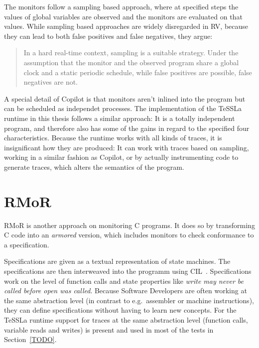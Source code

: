 The monitors follow a sampling based approach, where at specified steps the values of global variables are observed and the monitors are evaluated
on that values.
While sampling based approaches are widely disregarded in RV, because they can lead to both false positives and false negatives,
they argue:

\begin{quote}
  In a hard real-time context, sampling is a suitable strategy. Under
  the assumption that the monitor and the observed program share a global clock and a static periodic schedule, while false positives are possible, false negatives are not.~\cite{Pike2010}
\end{quote}

A special detail of Copilot is that monitors aren't inlined into the program but can be scheduled as independet processes.
The implementation of the TeSSLa runtime in this thesis follows a similar approach: It is a totally independent program,
and therefore also has some of the gains in regard to the specified four characteristics.
Because the runtime works with all kinds of traces, it is insignificant how they are produced:
It can work with traces based on sampling, working in a similar fashion as Copilot, or by actually instrumenting code to generate
traces, which alters the semantics of the program.


\section{RMoR}
\label{sec:related:rmor}

RMoR is another approach on monitoring C programs.
It does so by transforming C code into an \emph{armored} version, which includes monitors to check conformance to a specification.

Specifications are given as a textual representation of state machines.
The specifications are then interweaved into the programm using CIL~\cite{Necula2002}.
Specifications work on the level of function calls and state properties like \emph{write may never be called before open was called}.
Because Software Developers are often working at the same abstraction level (in contrast to e.g.\ assembler or machine instructions), they can define specifications without having to learn new concepts.
For the TeSSLa runtime support for traces at the same abstraction level (function calls, variable reads and writes) is present and used in most of the tests in Section~\ref{TODO}.


